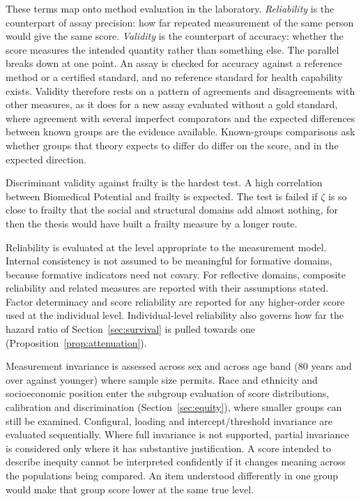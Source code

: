 These terms map onto method evaluation in the laboratory. \emph{Reliability} is the counterpart of assay precision: how far repeated measurement of the same person would give the same score. \emph{Validity} is the counterpart of accuracy: whether the score measures the intended quantity rather than something else. The parallel breaks down at one point. An assay is checked for accuracy against a reference method or a certified standard, and no reference standard for health capability exists. Validity therefore rests on a pattern of agreements and disagreements with other measures, as it does for a new assay evaluated without a gold standard, where agreement with several imperfect comparators and the expected differences between known groups are the evidence available. Known-groups comparisons ask whether groups that theory expects to differ do differ on the score, and in the expected direction.

Discriminant validity against frailty is the hardest test. A high correlation between Biomedical Potential and frailty is expected. The test is failed if $\zeta$ is so close to frailty that the social and structural domains add almost nothing, for then the thesis would have built a frailty measure by a longer route.

Reliability is evaluated at the level appropriate to the measurement model. Internal consistency is not assumed to be meaningful for formative domains, because formative indicators need not covary. For reflective domains, composite reliability and related measures are reported with their assumptions stated. Factor determinacy and score reliability are reported for any higher-order score used at the individual level. Individual-level reliability also governs how far the hazard ratio of Section~\ref{sec:survival} is pulled towards one (Proposition~\ref{prop:attenuation}).

Measurement invariance \citep{meredith_1993,vandenberg_lance_2000} is assessed across sex and across age band (80 years and over against younger) where sample size permits. Race and ethnicity and socioeconomic position enter the subgroup evaluation of score distributions, calibration and discrimination (Section~\ref{sec:equity}), where smaller groups can still be examined. Configural, loading and intercept/threshold invariance are evaluated sequentially. Where full invariance is not supported, partial invariance is considered only where it has substantive justification. A score intended to describe inequity cannot be interpreted confidently if it changes meaning across the populations being compared. An item understood differently in one group would make that group score lower at the same true level.

